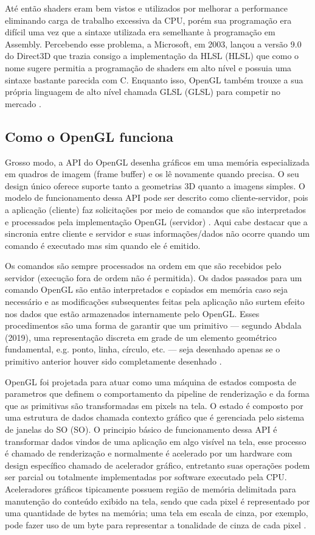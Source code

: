 Até então shaders eram bem vistos e utilizados por melhorar a performance eliminando carga de trabalho excessiva da \acrshort{CPU}, porém sua programação era difícil uma vez que a sintaxe utilizada era semelhante à programação em Assembly. Percebendo esse problema, a Microsoft, em 2003, lançou a versão 9.0 do Direct3D que trazia consigo a implementação da HLSL (\acrlong{HLSL}) que como o nome sugere permitia a programação de shaders em alto nível e possuia uma sintaxe bastante parecida com C. Enquanto isso, OpenGL também trouxe a sua própria linguagem de alto nível chamada GLSL (\acrlong{GLSL}) para competir no mercado \cite{openGLBook}. 

\subsection{Como o OpenGL funciona}
\label{sec:como-opengl-funciona}

Grosso modo, a API do OpenGL desenha gráficos em uma memória especializada em quadros de imagem (frame buffer) e os lê novamente quando precisa. O seu design único oferece suporte tanto a geometrias 3D quanto a imagens simples. O modelo de funcionamento dessa API pode ser descrito como cliente-servidor, pois a aplicação (cliente) faz solicitações por meio de comandos que são interpretados e processados pela implementação OpenGL (servidor) \cite{GLSLBook}. Aqui cabe destacar que a sincronia entre cliente e servidor e suas informações/dados não ocorre quando um comando é executado mas sim quando ele é emitido.

Os comandos são sempre processados na ordem em que são recebidos pelo servidor (execução fora de ordem não é permitida). Os dados passados para um comando OpenGL são então interpretados e copiados em memória caso seja necessário e as modificações subsequentes feitas pela aplicação não surtem efeito nos dados que estão armazenados internamente pelo OpenGL. Esses procedimentos são uma forma de garantir que um primitivo --- segundo Abdala (2019)\nocite{abdala}, uma representação discreta em grade de um elemento geométrico fundamental, e.g. ponto, linha, círculo, etc. --- seja desenhado apenas se o primitivo anterior houver sido completamente desenhado \cite{GLSLBook}.

OpenGL foi projetada para atuar como uma máquina de estados composta de parametros que definem o comportamento da pipeline de renderização e da forma que as primitivas são transformadas em pixels na tela. O estado é composto por uma estrutura de dados chamada contexto gráfico que é gerenciada pelo sistema de janelas do SO (\acrlong{SO}). O principio básico de funcionamento dessa API é transformar dados vindos de uma aplicação em algo visível na tela, esse processo é chamado de renderização e normalmente é acelerado por um hardware com design específico chamado de acelerador gráfico, entretanto suas operações podem ser parcial ou totalmente implementadas por software executado pela CPU. Aceleradores gráficos tipicamente possuem região de memória delimitada para manutenção do conteúdo exibido na tela, sendo que cada pixel é representado por uma quantidade de bytes na memória; uma tela em escala de cinza, por exemplo, pode fazer uso de um byte para representar a tonalidade de cinza de cada pixel \cite{GLSLBook}.

